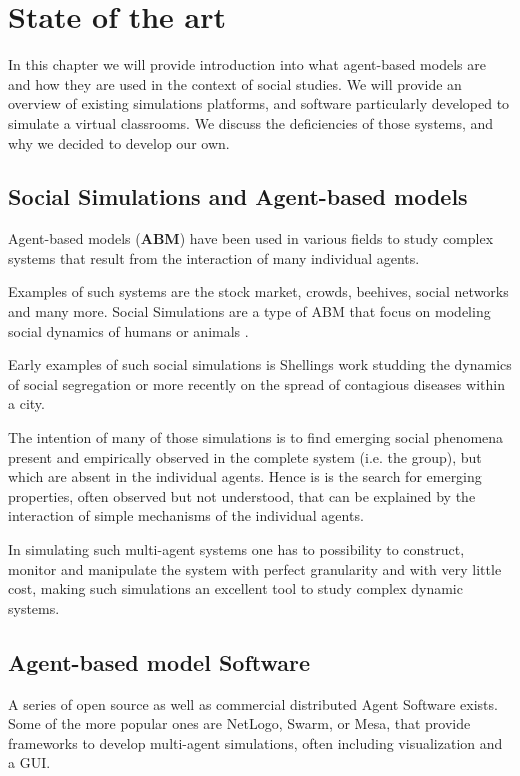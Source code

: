\label{StateOfTheArt}
\chapter{State of the art}
In this chapter we will provide introduction into what agent-based models are and
how they are used in the context of social studies. We will provide an overview
of existing simulations platforms, and software particularly developed to simulate
a virtual classrooms. We discuss the deficiencies of those systems, and why
we decided to develop our own.

\section{Social Simulations and Agent-based models}
Agent-based models (\textbf{ABM})\cite{Jackson2017} have been used in various fields
to study complex systems that result from the interaction of many individual agents.

Examples of such systems are the stock market, crowds, beehives, social networks and many
more. Social Simulations are a type of ABM that focus on modeling social dynamics
of humans or animals \cite{Helbing2012}.

Early examples of such social simulations is Shellings work \cite{Schelling1971}
studding the dynamics of social segregation or more recently on the spread of
contagious diseases\cite{Perez2009} within a city.

\bb

The intention of many of those simulations is to find emerging social phenomena
present and empirically observed in the complete system (i.e. the group), but
which are absent in the individual agents\cite{Jackson2017}.
Hence is is the search for emerging properties, often observed but not understood,
that can be explained by the interaction of simple mechanisms of the individual agents.

\bb

In simulating such multi-agent systems one has to possibility to construct, monitor
and manipulate the system with perfect granularity and with very little cost, making
such simulations an excellent tool to study complex dynamic systems.

\section{Agent-based model Software}
A series of open source as well as commercial distributed Agent Software\cite{Kravi2015}
exists. Some of the more popular ones are NetLogo\cite{Tissue2004},
Swarm\cite{Minar1996}, or Mesa\cite{Masad2015}, that provide frameworks
to develop multi-agent simulations, often including visualization and
a GUI.

